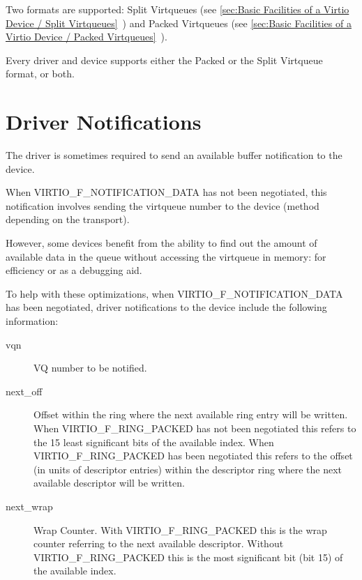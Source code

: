 Two formats are supported: Split Virtqueues (see \ref{sec:Basic
Facilities of a Virtio Device / Split
Virtqueues}~) and Packed Virtqueues (see \ref{sec:Basic
Facilities of a Virtio Device / Packed
Virtqueues}~).

Every driver and device supports either the Packed or the Split
Virtqueue format, or both.





\section{Driver Notifications} \label{sec:Virtqueues / Driver notifications}
The driver is sometimes required to send an available buffer
notification to the device.

When VIRTIO_F_NOTIFICATION_DATA has not been negotiated,
this notification involves sending the
virtqueue number to the device (method depending on the transport).

However, some devices benefit from the ability to find out the
amount of available data in the queue without accessing the virtqueue in memory:
for efficiency or as a debugging aid.

To help with these optimizations, when VIRTIO_F_NOTIFICATION_DATA
has been negotiated, driver notifications to the device include
the following information:

\begin{description}
\item [vqn] VQ number to be notified.
\item [next_off] Offset
      within the ring where the next available ring entry
      will be written.
      When VIRTIO_F_RING_PACKED has not been negotiated this refers to the
      15 least significant bits of the available index.
      When VIRTIO_F_RING_PACKED has been negotiated this refers to the offset
      (in units of descriptor entries)
      within the descriptor ring where the next available
      descriptor will be written.
\item [next_wrap] Wrap Counter.
      With VIRTIO_F_RING_PACKED this is the wrap counter
      referring to the next available descriptor.
      Without VIRTIO_F_RING_PACKED this is the most significant bit
      (bit 15) of the available index.
\end{description}

